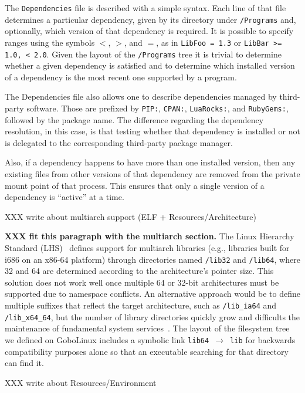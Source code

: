 \documentclass[sigplan, anonymous, 10pt]{acmart}
\begin{document}
The \texttt{Dependencies} file is described with a simple syntax. Each line of that file determines
a particular dependency, given by its directory under \texttt{/Programs} and, optionally,
which version of that dependency is required. It is possible to specify ranges using the
symbols $<$, $>$, and $=$, as in \texttt{LibFoo = 1.3} or \texttt{LibBar >= 1.0, < 2.0}.
Given the layout of the \texttt{/Programs} tree it is trivial to determine whether a given
dependency is satisfied and to determine which installed version of a dependency is the most
recent one supported by a program.

The Dependencies file also allows one to describe dependencies managed by third-party
software. Those are prefixed by \texttt{PIP:}, \texttt{CPAN:}, \texttt{LuaRocks:}, and
\texttt{RubyGems:}, followed by the package name. The difference regarding the dependency
resolution, in this case, is that testing whether that dependency is installed or not is
delegated to the corresponding third-party package manager.

Also, if a dependency happens to have more than
one installed version, then any existing files from other versions of that
dependency are removed from the private mount point of that process. This
ensures that only a single version of a dependency is ``active'' at a time.

XXX write about multiarch support (ELF + Resources/Architecture)
\lipsum[7]

\textbf{XXX fit this paragraph with the multiarch section.}
The Linux Hierarchy Standard (LHS)~\cite{lsb2015:fhs} defines support for
multiarch libraries (e.g., libraries built for i686 on an x86-64 platform)
through directories named \texttt{/lib32} and \texttt{/lib64},
where 32 and 64 are determined according to the architecture's pointer size.
This solution does not work well once multiple 64 or 32-bit architectures must
be supported due to namespace conflicts. An alternative approach would be to define
multiple suffixes that reflect the target architecture, such as \texttt{/lib\_ia64}
and \texttt{/lib\_x64\_64}, but the number of library directories quickly grow and
difficults the maintenance of fundamental system services~\cite{heen2005:thesis}.
The layout of the filesystem tree we defined on GoboLinux includes a symbolic link
\texttt{lib64 $\rightarrow$ lib} for backwards compatibility purposes alone so that
an executable searching for that directory can find it.

XXX write about Resources/Environment
\lipsum[8]
\end{document}
